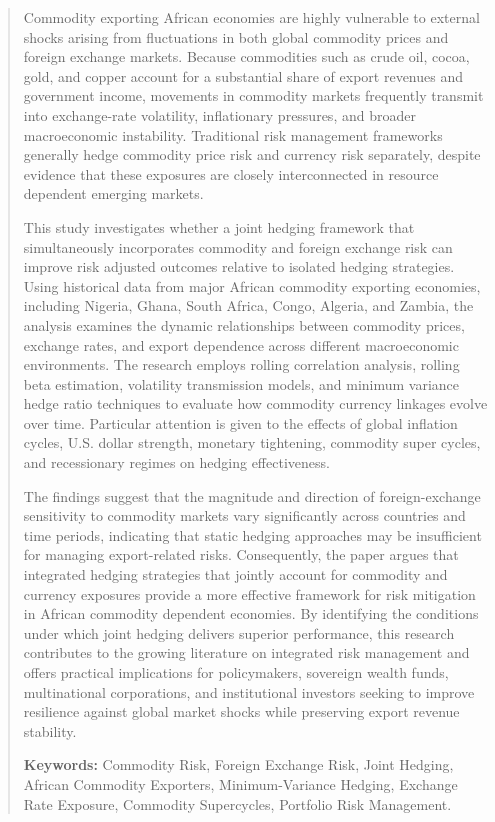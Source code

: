 \documentclass{article}
\begin{document}
\begin{abstract}
Commodity exporting African economies are highly vulnerable to external shocks arising from fluctuations in both global commodity prices and foreign exchange markets. Because commodities such as crude oil, cocoa, gold, and copper account for a substantial share of export revenues and government income, movements in commodity markets frequently transmit into exchange-rate volatility, inflationary pressures, and broader macroeconomic instability. Traditional risk management frameworks generally hedge commodity price risk and currency risk separately, despite evidence that these exposures are closely interconnected in resource dependent emerging markets.

This study investigates whether a joint hedging framework that simultaneously incorporates commodity and foreign exchange risk can improve risk adjusted outcomes relative to isolated hedging strategies. Using historical data from major African commodity exporting economies, including Nigeria, Ghana, South Africa, Congo, Algeria, and Zambia, the analysis examines the dynamic relationships between commodity prices, exchange rates, and export dependence across different macroeconomic environments. The research employs rolling correlation analysis, rolling beta estimation, volatility transmission models, and minimum variance hedge ratio techniques to evaluate how commodity currency linkages evolve over time. Particular attention is given to the effects of global inflation cycles, U.S. dollar strength, monetary tightening, commodity super cycles, and recessionary regimes on hedging effectiveness.

The findings suggest that the magnitude and direction of foreign-exchange sensitivity to commodity markets vary significantly across countries and time periods, indicating that static hedging approaches may be insufficient for managing export-related risks. Consequently, the paper argues that integrated hedging strategies that jointly account for commodity and currency exposures provide a more effective framework for risk mitigation in African commodity dependent economies. By identifying the conditions under which joint hedging delivers superior performance, this research contributes to the growing literature on integrated risk management and offers practical implications for policymakers, sovereign wealth funds, multinational corporations, and institutional investors seeking to improve resilience against global market shocks while preserving export revenue stability.

\vspace{0.5em}
\noindent
\textbf{Keywords:} Commodity Risk, Foreign Exchange Risk, Joint Hedging, African Commodity Exporters, Minimum-Variance Hedging, Exchange Rate Exposure, Commodity Supercycles, Portfolio Risk Management.

\end{abstract}
\end{document}
